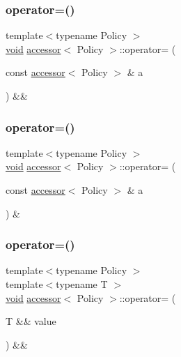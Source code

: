 \subsubsection{\texorpdfstring{operator=()}{operator=()}\hspace{0.1cm}{\footnotesize\ttfamily [1/4]}}
{\footnotesize\ttfamily template$<$typename Policy $>$ \\
\mbox{\hyperlink{_s_d_l__opengles2__gl2ext_8h_ae5d8fa23ad07c48bb609509eae494c95}{void}} \mbox{\hyperlink{classaccessor}{accessor}}$<$ Policy $>$\+::operator= (\begin{DoxyParamCaption}\item[{const \mbox{\hyperlink{classaccessor}{accessor}}$<$ Policy $>$ \&}]{a }\end{DoxyParamCaption}) \&\&\hspace{0.3cm}{\ttfamily [inline]}}

\mbox{\label{classaccessor_a69d00cfba942eeeda666733bf8b3e420}} 
\subsubsection{\texorpdfstring{operator=()}{operator=()}\hspace{0.1cm}{\footnotesize\ttfamily [2/4]}}
{\footnotesize\ttfamily template$<$typename Policy $>$ \\
\mbox{\hyperlink{_s_d_l__opengles2__gl2ext_8h_ae5d8fa23ad07c48bb609509eae494c95}{void}} \mbox{\hyperlink{classaccessor}{accessor}}$<$ Policy $>$\+::operator= (\begin{DoxyParamCaption}\item[{const \mbox{\hyperlink{classaccessor}{accessor}}$<$ Policy $>$ \&}]{a }\end{DoxyParamCaption}) \&\hspace{0.3cm}{\ttfamily [inline]}}

\mbox{\label{classaccessor_a41751202ddf456a8e1a2829867073ea0}} 
\subsubsection{\texorpdfstring{operator=()}{operator=()}\hspace{0.1cm}{\footnotesize\ttfamily [3/4]}}
{\footnotesize\ttfamily template$<$typename Policy $>$ \\
template$<$typename T $>$ \\
\mbox{\hyperlink{_s_d_l__opengles2__gl2ext_8h_ae5d8fa23ad07c48bb609509eae494c95}{void}} \mbox{\hyperlink{classaccessor}{accessor}}$<$ Policy $>$\+::operator= (\begin{DoxyParamCaption}\item[{T \&\&}]{value }\end{DoxyParamCaption}) \&\&\hspace{0.3cm}{\ttfamily [inline]}}

